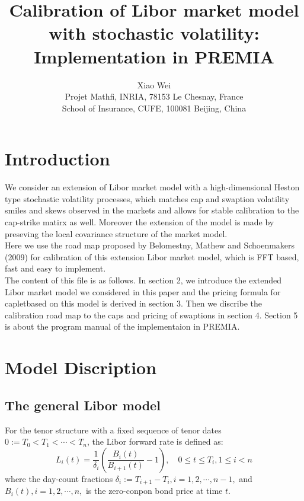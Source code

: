 \documentclass[12pt]{article}
\theoremstyle{definition}
\numberwithin{equation}{section} \theoremstyle{remark}
\begin{document}
\title{Calibration of Libor market model with stochastic volatility: Implementation in PREMIA}
\vspace{4cm}
\author{ Xiao Wei\\[0.3cm]
Projet Mathfi, INRIA, 78153 Le Chesnay, France\\
School of Insurance, CUFE,  100081 Beijing, China}

\date{ }

\def\beq{\begin{equation}}
\def\nneq{\end{equation}}



\vspace{3cm}
\maketitle

\vspace{0.5cm}
\section{Introduction}
We consider an extension of Libor market model with a high-dimensional
Heston type stochastic volatility processes, which matches cap and swaption
volatility smiles and skews observed in the markets and allows for stable
calibration to the cap-strike matirx as well. Moreover the extension of
the model is made by preseving the local covariance structure of the
market model.\\

Here we use the road map proposed by
Belomestny, Mathew and Schoenmakers (2009) for calibration of this extension
Libor market model, which is FFT based, fast and easy to implement.\\

The content of this file is as follows. In section 2, we introduce the extended Libor
market model we considered in this paper and the pricing formula for capletbased on this
model is derived in section 3. Then we discribe the calibration road map to the caps and
pricing of swaptions in section 4. Section 5 is about the program manual of the
implementaion in PREMIA.\\


\section{Model Discription}
\subsection{The general Libor model}
For the tenor structure with a fixed sequence of tenor dates $0:=T_0<T_1<\cdots< T_n$, the Libor
forward rate is defined as:
$$
L_i(t)=\frac{1}{\delta_i}\left(\frac{B_i(t)}{B_{i+1}(t)}-1\right), \quad 0\leq t\leq T_i, 1\leq i<n
$$
where the day-count fractions $\delta_i:= T_{i+1}-T_i, i=1,2, \cdots, n-1,$ and
$B_i(t), i=1,2, \cdots, n, $ is the zero-conpon bond price at time $t$.\\
\end{document}
